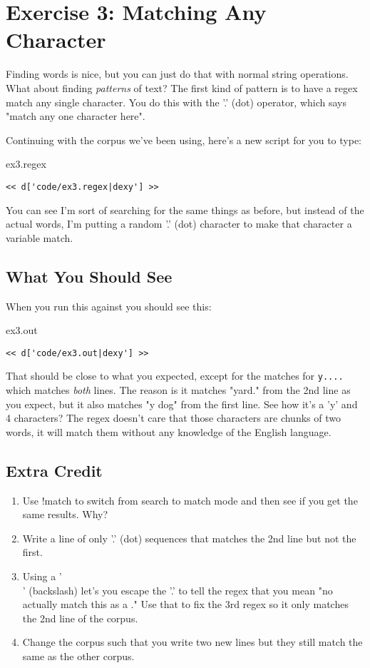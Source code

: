 \chapter{Exercise 3: Matching Any Character}

Finding words is nice, but you can just do that with normal
string operations.  What about finding \emph{patterns} of text?
The first kind of pattern is to have a regex match any single 
character.  You do this with the '.' (dot) operator, which
says "match any one character here".

Continuing with the corpus we've been using, here's
a new script for you to type:

\begin{code}{ex3.regex}
\begin{Verbatim}
<< d['code/ex3.regex|dexy'] >>
\end{Verbatim}
\end{code}

You can see I'm sort of searching for the same things as before, but instead
of the actual words, I'm putting a random '.' (dot) character to make that
character a variable match.

\section{What You Should See}

When you run this against  you should see this:

\begin{code}{ex3.out}
\begin{Verbatim}
<< d['code/ex3.out|dexy'] >>
\end{Verbatim}
\end{code}

That should be close to what you expected, except for the matches for
\verb|y....| which matches \emph{both} lines.  The reason is it matches
"yard." from the 2nd line as you expect, but it also matches "y dog"
from the first line.  See how it's a 'y' and 4 characters?  The regex
doesn't care that those characters are chunks of two words, it will match
them without any knowledge of the English language.


\section{Extra Credit}

\begin{enumerate}
\item Use !match to switch from search to match mode and then see if you
    get the same results.  Why?
\item Write a line of only '.' (dot) sequences that matches the 2nd line
    but not the first.
\item Using a '\\' (backslash) let's you escape the '.' to tell the regex
    that you mean "no actually match this as a ."  Use that to fix the
    3rd regex so it only matches the 2nd line of the corpus.
\item Change the corpus such that you write two new lines but they still
    match the same as the other corpus.
\end{enumerate}


